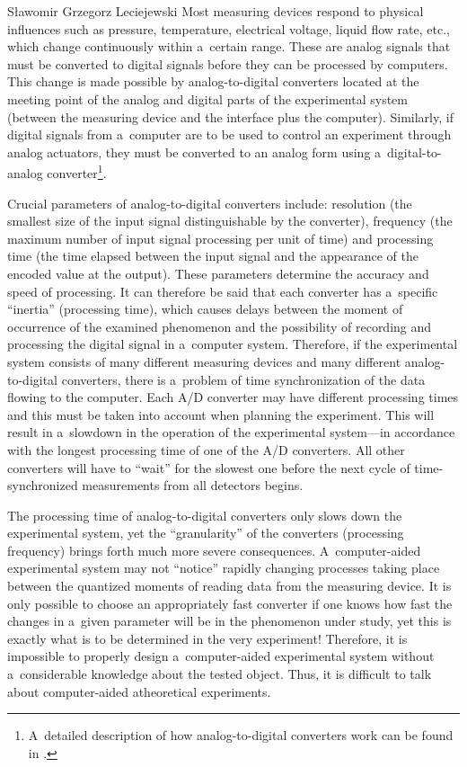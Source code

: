 \begin{artengenv}{Sławomir Grzegorz Leciejewski}
Most measuring devices respond to physical influences such as pressure, temperature, electrical voltage, liquid flow rate, etc., which change continuously within a~certain range. These are analog signals that must be converted to digital signals before they can be processed by computers. This change is made possible by analog-to-digital converters located at the meeting point of the analog and digital parts of the experimental system (between the measuring device and the interface plus the computer). Similarly, if digital signals from a~computer are to be used to control an experiment through analog actuators, they must be converted to an analog form using a~digital-to-analog converter\footnote{A~detailed description of how analog-to-digital converters work can be found in 
\parencite[][]{pelgrom_analog--digital_2022}.%
}.



Crucial parameters of analog-to-digital converters include: resolution (the smallest size of the input signal distinguishable by the converter), frequency (the maximum number of input signal processing per unit of time) and processing time (the time elapsed between the input signal and the appearance of the encoded value at the output). These parameters determine the accuracy and speed of processing. It can therefore be said that each converter has a~specific ``inertia'' (processing time), which causes delays between the moment of occurrence of the examined phenomenon and the possibility of recording and processing the digital signal in a~computer system. Therefore, if the experimental system consists of many different measuring devices and many different analog-to-digital converters, there is a~problem of time synchronization of the data flowing to the computer. Each A/D converter may have different processing times and this must be taken into account when planning the experiment. This will result in a~slowdown in the operation of the experimental system---in accordance with the longest processing time of one of the A/D converters. All other converters will have to ``wait'' for the slowest one before the next cycle of time-synchronized measurements from all detectors begins.



The processing time of analog-to-digital converters only slows down the experimental system, yet the ``granularity'' of the converters (processing frequency) brings forth much more severe consequences. A~computer-aided experimental system may not ``notice'' rapidly changing processes taking place between the quantized moments of reading data from the measuring device. It is only possible to choose an appropriately fast converter if one knows how fast the changes in a~given parameter will be in the phenomenon under study, yet this is exactly what is to be determined in the very experiment! Therefore, it is impossible to properly design a~computer-aided experimental system without a~considerable knowledge about the tested object. Thus, it is difficult to talk about computer-aided atheoretical experiments.




\end{artengenv}
